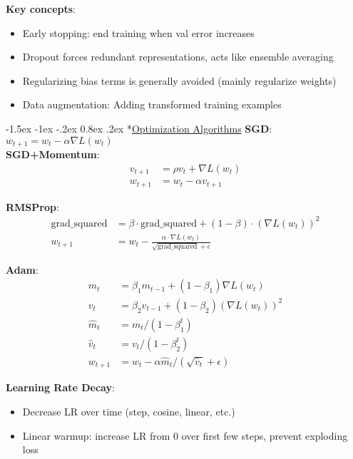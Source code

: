 \documentclass{article}
\makeatletter
\renewcommand\section{\@startsection{section}{1}{\z@}%
                                  {-1.5ex \@plus -1ex \@minus -.2ex}%
                                  {0.8ex \@plus.2ex}%
                                  {\normalfont\small\bfseries}}
\makeatother
\begin{document}
\begin{multicols}{3}
\textbf{Key concepts}:
\begin{itemize}
\item Early stopping: end training when val error increases
\item Dropout forces redundant representations, acts like ensemble averaging
\item Regularizing bias terms is generally avoided (mainly regularize weights)
\item Data augmentation: Adding transformed training examples
\end{itemize}

\section*{\underline{Optimization Algorithms}}
\textbf{SGD}: $w_{t+1} = w_t - \alpha \nabla L(w_t)$\\
\textbf{SGD+Momentum}: 
\begin{align*}
v_{t+1} &= \rho v_t + \nabla L(w_t) \tag{typically $\rho = 0.9$ or $0.99$}\\
w_{t+1} &= w_t - \alpha v_{t+1}
\end{align*}

\textbf{RMSProp}:
\begin{align*}
\text{grad\_squared} &= \beta \cdot \text{grad\_squared} + (1-\beta) \cdot (\nabla L(w_t))^2\\
w_{t+1} &= w_t - \frac{\alpha \cdot \nabla L(w_t)}{\sqrt{\text{grad\_squared}} + \epsilon}
\end{align*}

\textbf{Adam}:
\begin{align*}
m_t &= \beta_1 m_{t-1} + (1-\beta_1)\nabla L(w_t) \tag{momentum}\\
v_t &= \beta_2 v_{t-1} + (1-\beta_2)(\nabla L(w_t))^2 \tag{RMSProp}\\
\hat{m}_t &= m_t / (1-\beta_1^t) \tag{bias correction}\\
\hat{v}_t &= v_t / (1-\beta_2^t) \tag{bias correction}\\
w_{t+1} &= w_t - \alpha \hat{m}_t / (\sqrt{\hat{v}_t} + \epsilon)
\end{align*}

\textbf{Learning Rate Decay}:
\begin{itemize}
\item Decrease LR over time (step, cosine, linear, etc.)
\item Linear warmup: increase LR from 0 over first few steps, prevent exploding loss
\end{itemize}


\end{multicols}
\end{document}

